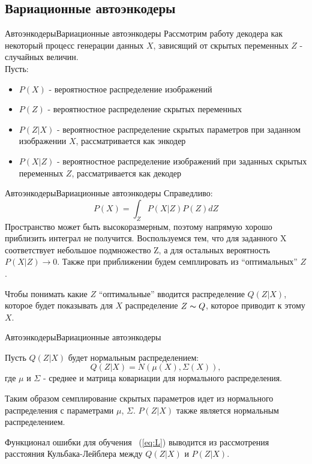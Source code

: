 \documentclass{beamer}
\begin{document}
\subsection{Вариационные автоэнкодеры}

\begin{frame}{Автоэнкодеры}{Вариационные автоэнкодеры}
Рассмотрим работу декодера как некоторый процесс генерации данных $X$, зависящий от скрытых переменных $Z$ - случайных величин.\\
Пусть:
\begin{itemize}
\item $P(X)$ - вероятностное распределение изображений
\item $P(Z)$ - вероятностное распределение скрытых переменных
\item $P(Z|X)$ - вероятностное распределение скрытых параметров при заданном изображении $X$, рассматривается как энкодер
\item $P(X|Z)$ - вероятностное распределение изображений при заданных скрытых переменных $Z$, рассматривается как декодер
\end{itemize}
\end{frame}

\begin{frame}{Автоэнкодеры}{Вариационные автоэнкодеры}
Справедливо:
\begin{equation}\label{eq:int}
P(X) = \int_{Z} P(X|Z)P(Z) dZ
\end{equation}
Пространство может быть высокоразмерным, поэтому напрямую хорошо приблизить интеграл не получится. Воспользуемся тем, что для заданного X соответствует небольшое подмножество Z, а для остальных вероятность $P(X|Z) \to 0$. Также при приближении будем семплировать из ``оптимальных'' $Z$. \par\medskip
Чтобы понимать какие $Z$ ``оптимальные'' вводится распределение $Q(Z|X)$, которое будет показывать для $X$ распределение $Z \thicksim Q$, которое приводит к этому $X$.
\end{frame}

\begin{frame}{Автоэнкодеры}{Вариационные автоэнкодеры}

Пусть $Q(Z|X)$ будет нормальным распределением:
\begin{equation}\label{eq:Q}
Q(Z|X) = N(\mu(X), \Sigma(X)),
\end{equation}
где $\mu$ и $\Sigma$ - среднее и матрица ковариации для нормального распределения. \par\medskip
Таким образом семплирование скрытых параметров идет из нормального распределения с параметрами $\mu$, $\Sigma$. $P(Z|X)$ также является нормальным распределением. \par\medskip
Функционал ошибки для обучения ~(\ref{eq:L}) выводится из рассмотрения расстояния Кульбака-Лейблера между $Q(Z|X)$ и $P(Z|X)$.

\end{frame}
\end{document}
